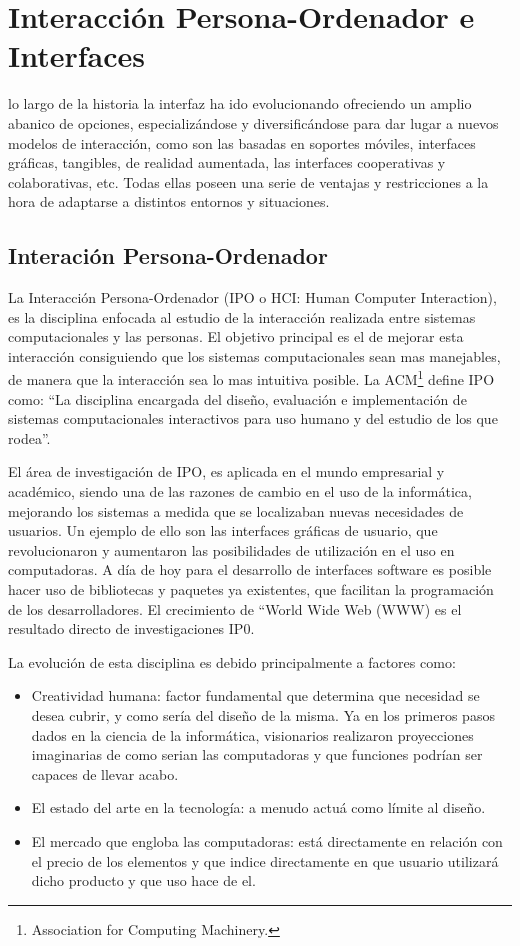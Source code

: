 \chapter{Interacción Persona-Ordenador e Interfaces}
\label{chap:interfaces}
 lo largo de la historia la interfaz ha ido evolucionando ofreciendo un amplio abanico de opciones,
especializándose y diversificándose para dar lugar a nuevos modelos de interacción, como son las basadas en soportes móviles, interfaces gráficas, tangibles, de realidad aumentada, las interfaces cooperativas y colaborativas, etc. Todas ellas poseen una serie de ventajas y restricciones a la hora de adaptarse a distintos entornos y situaciones.


\section{Interación Persona-Ordenador}
La Interacción Persona-Ordenador (IPO o HCI: Human Computer Interaction), es la disciplina enfocada al estudio de la interacción realizada entre sistemas computacionales y las personas. El objetivo principal es el de mejorar esta interacción  consiguiendo que los sistemas computacionales sean mas manejables, de manera que la interacción sea lo mas intuitiva posible. 
La ACM\footnote{Association for Computing Machinery.} define IPO como: “La disciplina encargada del diseño, evaluación e implementación de sistemas computacionales interactivos para uso humano y del estudio de los que rodea”.

El área de investigación de IPO, es aplicada en el mundo empresarial y académico, siendo una de las razones de cambio en el uso de la informática, mejorando los sistemas a medida que se localizaban nuevas necesidades de usuarios. Un ejemplo de ello son las interfaces gráficas de usuario, que revolucionaron y aumentaron las posibilidades de utilización en el uso en computadoras. A día de hoy para el desarrollo de interfaces software es posible hacer uso de bibliotecas y paquetes ya existentes, que facilitan la programación de los desarrolladores. El crecimiento de “World Wide Web (WWW) es el resultado directo de investigaciones IP0.

La evolución de esta disciplina es debido principalmente a factores como:
\begin{itemize}
\item Creatividad humana: factor fundamental que determina que necesidad se desea cubrir, y como sería del diseño de la misma. Ya en los primeros pasos dados en la ciencia de la informática, visionarios realizaron proyecciones imaginarias de como serian las computadoras y que funciones podrían ser capaces de llevar acabo.
\item El estado del arte en la tecnología: a menudo actuá como límite al diseño.
\item El mercado que engloba las computadoras: está directamente en relación con el precio de los elementos y que indice directamente en que usuario utilizará dicho producto y que uso hace de el.
\end{itemize}

